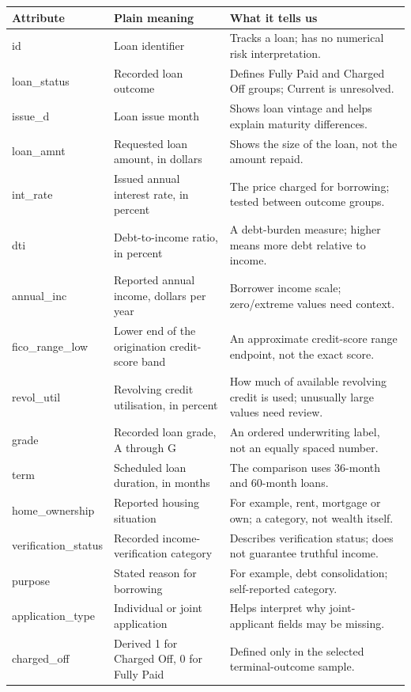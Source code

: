 \documentclass[10pt,a4paper,twocolumn]{article}
\begin{document}
\begin{tabularx}{\linewidth}{@{}l X X@{}}\toprule Attribute & Plain meaning & What it tells us\\\midrule
id & Loan identifier & Tracks a loan; has no numerical risk interpretation.\\
loan\_status & Recorded loan outcome & Defines Fully Paid and Charged Off groups; Current is unresolved.\\
issue\_d & Loan issue month & Shows loan vintage and helps explain maturity differences.\\
loan\_amnt & Requested loan amount, in dollars & Shows the size of the loan, not the amount repaid.\\
int\_rate & Issued annual interest rate, in percent & The price charged for borrowing; tested between outcome groups.\\
dti & Debt-to-income ratio, in percent & A debt-burden measure; higher means more debt relative to income.\\
annual\_inc & Reported annual income, dollars per year & Borrower income scale; zero/extreme values need context.\\
fico\_range\_low & Lower end of the origination credit-score band & An approximate credit-score range endpoint, not the exact score.\\
revol\_util & Revolving credit utilisation, in percent & How much of available revolving credit is used; unusually large values need review.\\
grade & Recorded loan grade, A through G & An ordered underwriting label, not an equally spaced number.\\
term & Scheduled loan duration, in months & The comparison uses 36-month and 60-month loans.\\
home\_ownership & Reported housing situation & For example, rent, mortgage or own; a category, not wealth itself.\\
verification\_status & Recorded income-verification category & Describes verification status; does not guarantee truthful income.\\
purpose & Stated reason for borrowing & For example, debt consolidation; self-reported category.\\
application\_type & Individual or joint application & Helps interpret why joint-applicant fields may be missing.\\
charged\_off & Derived 1 for Charged Off, 0 for Fully Paid & Defined only in the selected terminal-outcome sample.\\\bottomrule\end{tabularx}
\end{document}
